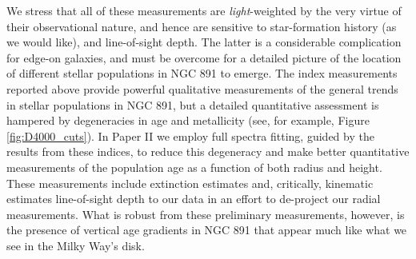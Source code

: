 
We stress that all of these measurements are {\it light}-weighted by
the very virtue of their observational nature, and hence are sensitive
to star-formation history (as we would like), and line-of-sight
depth. The latter is a considerable complication for edge-on galaxies,
and must be overcome for a detailed picture of the location of
different stellar populations in NGC 891 to emerge. The index
measurements reported above provide powerful qualitative measurements
of the general trends in stellar populations in NGC 891, but a
detailed quantitative assessment is hampered by degeneracies in age
and metallicity (see, for example, Figure \ref{fig:D4000_cuts}).  In
Paper II we employ full spectra fitting, guided by the results from
these indices, to reduce this degeneracy and make better quantitative
measurements of the population age as a function of both radius and
height. These measurements include extinction estimates and,
critically, kinematic estimates line-of-sight depth to our data in an
effort to de-project our radial measurements. What is robust from
these preliminary measurements, however, is the presence of vertical
age gradients in NGC 891 that appear much like what we see in the
Milky Way's disk.


